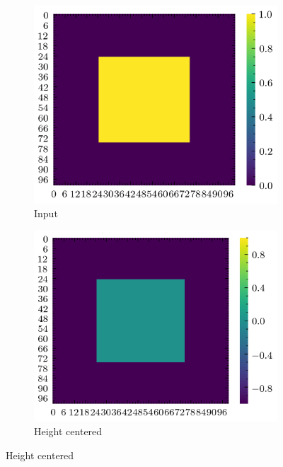 \documentclass[../document.tex]{subfiles}
\begin{document}
\begin{figure}[H]
        \begin{subfigure}[b]{0.5\textwidth}
            \includegraphics[width=\textwidth]{../img/data-aug/2d/square-middle.png}
            \caption{Input}
        \end{subfigure}
        \begin{subfigure}[b]{0.5\textwidth}
            \includegraphics[width=\textwidth]{../img/data-aug/2d/square-middle-center.png}
            \caption{Height centered}
        \end{subfigure}  
        

\end{figure}
\end{document}
